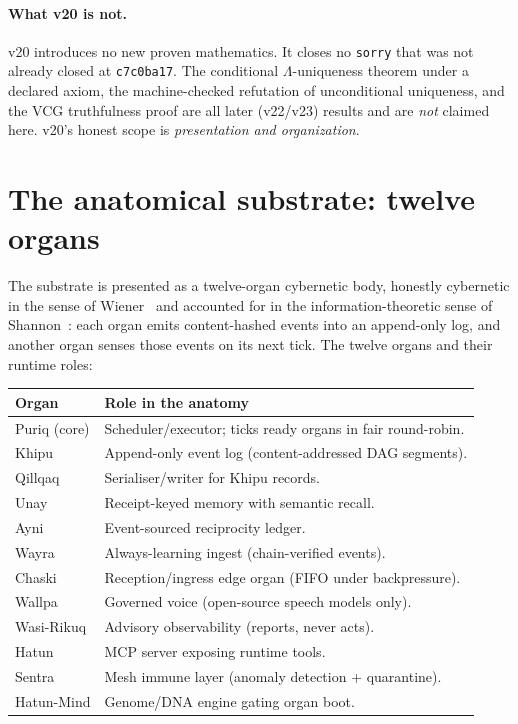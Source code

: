 \documentclass[11pt]{article}
\theoremstyle{plain}
\theoremstyle{definition}
\theoremstyle{remark}
\newcommand{\La}{\Lambda}
\begin{document}
\paragraph{What v20 is not.}
v20 introduces no new proven mathematics. It closes no \texttt{sorry} that was not
already closed at \texttt{c7c0ba17}. The conditional $\La$-uniqueness theorem under a
declared axiom, the machine-checked refutation of unconditional uniqueness, and the VCG
truthfulness proof are all later (v22/v23) results and are \emph{not} claimed here.
v20's honest scope is \emph{presentation and organization}.

\section{The anatomical substrate: twelve organs}
\label{sec:anatomy}

The substrate is presented as a twelve-organ cybernetic body, honestly cybernetic in the
sense of Wiener~\cite{wiener1948} and accounted for in the information-theoretic sense of
Shannon~\cite{shannon1948}: each organ emits content-hashed events into an append-only
log, and another organ senses those events on its next tick. The twelve organs and their
runtime roles:

\begin{center}
\begin{tabular}{@{}ll@{}}
\toprule
\textbf{Organ} & \textbf{Role in the anatomy}\\
\midrule
Puriq (core) & Scheduler/executor; ticks ready organs in fair round-robin.\\
Khipu & Append-only event log (content-addressed DAG segments).\\
Qillqaq & Serialiser/writer for Khipu records.\\
Unay & Receipt-keyed memory with semantic recall.\\
Ayni & Event-sourced reciprocity ledger.\\
Wayra & Always-learning ingest (chain-verified events).\\
Chaski & Reception/ingress edge organ (FIFO under backpressure).\\
Wallpa & Governed voice (open-source speech models only).\\
Wasi-Rikuq & Advisory observability (reports, never acts).\\
Hatun & MCP server exposing runtime tools.\\
Sentra & Mesh immune layer (anomaly detection + quarantine).\\
Hatun-Mind & Genome/DNA engine gating organ boot.\\
\bottomrule
\end{tabular}
\end{center}
\end{document}
